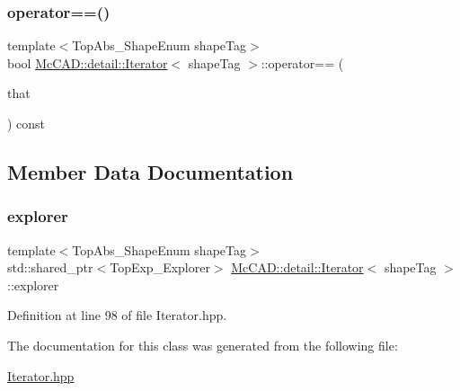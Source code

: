 \mbox{\label{classMcCAD_1_1detail_1_1Iterator_aa8c123d22356404064f03b2f148d7932}} 
\subsubsection{\texorpdfstring{operator==()}{operator==()}}
{\footnotesize\ttfamily template$<$Top\+Abs\+\_\+\+Shape\+Enum shape\+Tag$>$ \\
bool \hyperlink{classMcCAD_1_1detail_1_1Iterator}{Mc\+C\+A\+D\+::detail\+::\+Iterator}$<$ shape\+Tag $>$\+::operator== (\begin{DoxyParamCaption}\item[{const \hyperlink{classMcCAD_1_1detail_1_1Iterator}{Iterator}$<$ shape\+Tag $>$ \&}]{that }\end{DoxyParamCaption}) const}



\subsection{Member Data Documentation}
\mbox{\label{classMcCAD_1_1detail_1_1Iterator_a49cc02fa92619690477efd1334df03c1}} 
\subsubsection{\texorpdfstring{explorer}{explorer}}
{\footnotesize\ttfamily template$<$Top\+Abs\+\_\+\+Shape\+Enum shape\+Tag$>$ \\
std\+::shared\+\_\+ptr$<$Top\+Exp\+\_\+\+Explorer$>$ \hyperlink{classMcCAD_1_1detail_1_1Iterator}{Mc\+C\+A\+D\+::detail\+::\+Iterator}$<$ shape\+Tag $>$\+::explorer\hspace{0.3cm}{\ttfamily [private]}}



Definition at line 98 of file Iterator.\+hpp.



The documentation for this class was generated from the following file\+:\begin{DoxyCompactItemize}
\item 
\hyperlink{Iterator_8hpp}{Iterator.\+hpp}\end{DoxyCompactItemize}
